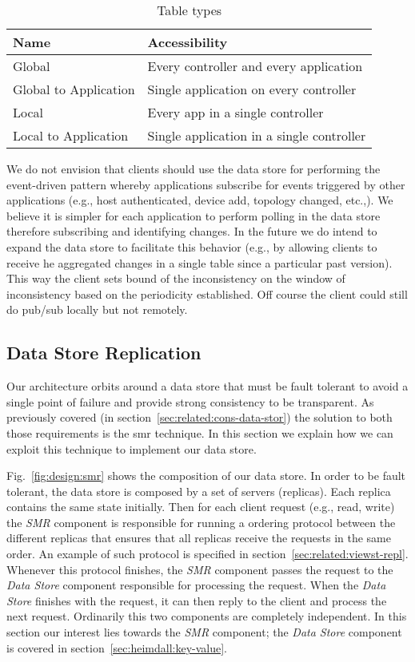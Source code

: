 \begin{table}[ht]
  \centering
  \begin{tabular}{ll}
    Name & Accessibility \\ \toprule 
    Global & Every controller and every application   \\ 
    Global to Application & Single application on every controller \\
    Local & Every app in a single controller \\
    Local to Application &  Single application in a single controller \\ \bottomrule 
  \end{tabular}
  \caption{Table types}
  \label{tab:table-types}
\end{table}

We do not envision that clients should use the data store for performing the event-driven pattern whereby applications subscribe for events triggered by other applications (e.g., host authenticated, device add, topology changed, etc.,). We believe it is simpler for each application to perform polling in the data store therefore subscribing and identifying changes. In the future we do intend to expand the data store to facilitate this behavior (e.g., by allowing clients to receive he aggregated changes in a single table since a particular past version).
This way the client sets bound of the inconsistency on the window of inconsistency based on the periodicity established. Off course the client could still do pub/sub locally but not remotely. 


\subsection{Data Store Replication}
Our architecture orbits around a data store that must be fault tolerant to avoid a single point of failure and provide strong consistency to be transparent. 
As previously covered (in section~\ref{sec:related:cons-data-stor}) the solution to both those requirements is the \gls{smr}  technique. 
In this section we explain how we can exploit this technique to implement our data store. 

Fig.~\ref{fig:design:smr} shows the composition of our data store. 
In order to be fault tolerant, the data store is composed by a set of servers (replicas). Each replica contains the same state initially. 
Then for each client request (e.g., read, write)  the \emph{SMR} component is responsible for running a ordering protocol between the different replicas that ensures that all replicas receive the requests in the same order.
 An example of such protocol is specified in  section~\ref{sec:related:viewst-repl}. Whenever this protocol finishes, the \emph{SMR} component passes the request to the \emph{Data Store} component responsible for processing the request. 
When the \emph{Data Store} finishes with the request, it can then reply to the client and process the next request.
Ordinarily this two components are completely independent.  In this section our interest lies towards the \emph{SMR} component; the \emph{Data Store} component is covered in section~\ref{sec:heimdall:key-value}. 

